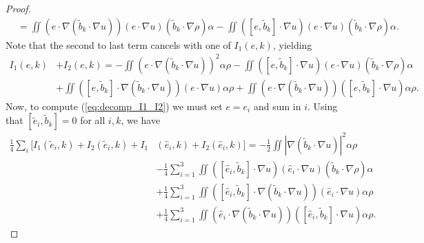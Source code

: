 \documentclass[11pt]{amsart}
\numberwithin{equation}{section}
\begin{document}
\begin{proof}
\begin{align*}
  & \!=\!\iint\!\left(e\cdot\nabla\left(\tilde{b}_{k}\cdot\nabla u\right)\right)\left(e\cdot\nabla u\right)\left(\tilde{b}_{k}\cdot\nabla\rho\right)\alpha-\!\iint\!\left([e,\tilde{b}_{k}]\cdot\nabla u\right)\left(e\cdot\nabla u\right)\left(\tilde{b}_{k}\cdot\nabla\rho\right)\alpha.
\end{align*}
%
Note that the second to last term cancels with one of $I_1(e,k)$, yielding
% 
\begin{align*}
  I_{1}(e,k) & +I_{2}(e,k) 
  =-\iint\left(e\cdot\nabla\left(\tilde{b}_{k}\cdot\nabla u\right)\right)^{2}\alpha\rho
  -\iint\left([e,\tilde{b}_{k}]\cdot\nabla u\right)\left(e\cdot\nabla u\right)\left(\tilde{b}_{k}\cdot\nabla\rho\right)\alpha	\\
  & +\iint\left([e,\tilde{b}_{k}]\cdot\nabla\left(\tilde{b}_{k}\cdot\nabla u\right)\right)\left(e\cdot\nabla u\right)\alpha\rho
  +\iint\left(e\cdot\nabla\left(\tilde{b}_{k}\cdot\nabla u\right)\right)\left([e,\tilde{b}_{k}]\cdot\nabla u\right)\alpha\rho.
\end{align*}
% 
Now, to compute (\ref{eq:decomp_I1_I2}) we must set $e=e_i$ and sum in $i$. Using that $[\tilde e_i,\tilde b_k]=0$ for all $i,k$, we have
% 
\begin{align}
  \nonumber
   \frac{1}{4}\sum_{i}\big[I_{1}(\tilde{e}_{i},k)+I_{2}(\tilde{e}_{i},k) +I_{1} &(\hat{e}_{i},k)+I_{2}(\hat{e}_{i},k)\big] 
    =-\frac{1}{2}\iint\left|\nabla\left(\tilde{b}_{k}\cdot\nabla u\right)\right|^{2}\alpha\rho\\
  &-\frac{1}{4}\sum_{i=1}^{3}\iint\left([\hat{e}_{i},\tilde{b}_{k}]\cdot\nabla u\right)\left(\hat{e}_{i}\cdot\nabla u\right)\left(\tilde{b}_{k}\cdot\nabla\rho\right)\alpha \label{eq:vanish1}\\
  & +\frac{1}{4}\sum_{i=1}^{3}\iint\left([\hat{e}_{i},\tilde{b}_{k}]\cdot\nabla\left(\tilde{b}_{k}\cdot\nabla u\right)\right)\left(\hat{e}_{i}\cdot\nabla u\right)\alpha\rho \label{eq:vanish2}\\
  &+\frac{1}{4}\sum_{i=1}^{3}\iint\left(\hat{e}_{i}\cdot\nabla\left(\tilde{b}_{k}\cdot\nabla u\right)\right)\left([\hat{e}_{i},\tilde{b}_{k}]\cdot\nabla u\right)\alpha\rho \label{eq:vanish3}.
\end{align}

\end{proof}
\end{document}
